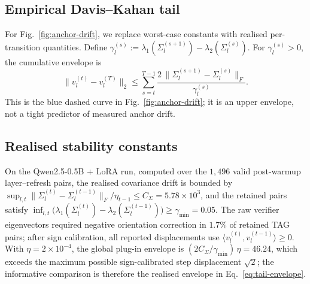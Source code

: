 \vspace{-0.6em}
\subsection{Empirical Davis--Kahan tail}
\label{app:proof-envelope}
For Fig.~\ref{fig:anchor-drift}, we replace worst-case constants with
realised per-transition quantities. Define
$\gamma_l^{(s)}:=\lambda_1(\Sigma_l^{(s+1)})-\lambda_2(\Sigma_l^{(s)})$.
For $\gamma_l^{(s)}>0$, the cumulative envelope is
\begin{equation}
\|v_l^{(t)}-v_l^{(T)}\|_2
\le \sum_{s=t}^{T-1}
   \frac{2\,\|\Sigma_l^{(s+1)}-\Sigma_l^{(s)}\|_F}{\gamma_l^{(s)}}.
\label{eq:tail-envelope}
\end{equation}
This is the blue dashed curve in Fig.~\ref{fig:anchor-drift}; it is an
upper envelope, not a tight predictor of measured anchor drift.

\vspace{-0.6em}
\subsection{Realised stability constants}
\label{app:stability-assumptions}
On the Qwen2.5-0.5B + LoRA run, computed over the $1{,}496$ valid
post-warmup layer--refresh pairs, the realised covariance drift is
bounded by
$\sup_{l,t}\|\Sigma_l^{(t)}-\Sigma_l^{(t-1)}\|_F/\eta_{t-1}
\le C_\Sigma=5.78\times10^{3}$,
and the retained pairs satisfy
$\inf_{l,t}\bigl(\lambda_1(\Sigma_l^{(t)})-\lambda_2(\Sigma_l^{(t-1)})\bigr)
\ge\gamma_{\min}=0.05$.
The raw verifier eigenvectors required negative orientation correction
in $1.7\%$ of retained \textsc{TAG} pairs; after sign calibration, all
reported displacements use $\langle v_l^{(t)},v_l^{(t-1)}\rangle\ge 0$.
With $\eta=2\times10^{-4}$, the global plug-in envelope is
$(2C_\Sigma/\gamma_{\min})\,\eta=46.24$, which exceeds the maximum
possible sign-calibrated step displacement $\sqrt{2}$; the informative
comparison is therefore the realised envelope in
Eq.~\eqref{eq:tail-envelope}.%

